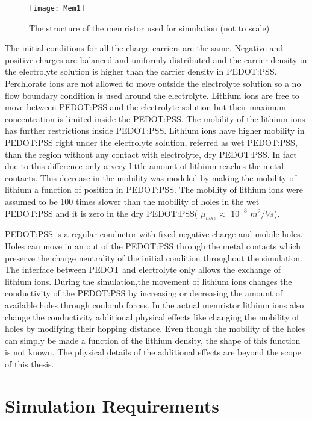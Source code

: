 \begin{doublespace}
\begin{figure}[!htp]
\centering
\texttt{[image: Mem1]}
\caption{The structure of the memristor used for simulation (not to scale)} 
\label{MemStc}
\end{figure}


The initial conditions for all the charge carriers are the same. Negative and positive charges are balanced and uniformly distributed and the carrier density in the electrolyte solution is higher than the carrier density in PEDOT:PSS. Perchlorate ions are not allowed to move outside the electrolyte solution so a no flow boundary condition is used around the electrolyte. Lithium ions are free to move between PEDOT:PSS and the electrolyte solution but their maximum concentration is limited inside the PEDOT:PSS. The mobility of the lithium ions has further restrictions inside PEDOT:PSS. Lithium ions have higher mobility in PEDOT:PSS right under the electrolyte solution, referred as wet PEDOT:PSS, than the region without any contact with electrolyte, dry PEDOT:PSS. In fact due to this difference only a very little amount of lithium reaches the metal contacts. This decrease in the mobility was modeled by making the mobility of lithium a function of position in PEDOT:PSS. The mobility of lithium ions were assumed to be 100 times slower than the mobility of holes in the wet PEDOT:PSS and it is zero in the dry PEDOT:PSS( $\mu_{hole} \approx$ $10^{-3}$ $m^2/Vs$). 


PEDOT:PSS is a regular conductor with fixed negative charge and mobile holes. Holes can move in an out of the PEDOT:PSS through the metal contacts which preserve the charge neutrality of the initial condition throughout the simulation. The interface between PEDOT and electrolyte only allows the exchange of lithium ions. During the simulation,the movement of lithium ions changes the conductivity of the PEDOT:PSS by increasing or decreasing the amount of available holes through coulomb forces. In the actual memristor lithium ions also change the conductivity additional physical effects like changing the mobility of holes by modifying their hopping distance. Even though the mobility of the holes can simply be made a function of the lithium density, the shape of this function is not known. The physical details of the additional effects are beyond the scope of this thesis. 


\clearpage
\section{Simulation Requirements}


\end{doublespace}
